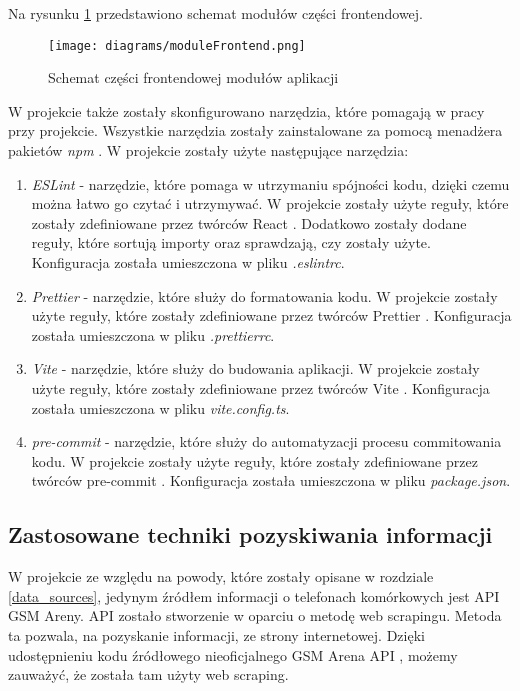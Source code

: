 Na rysunku \ref{module_frontend} przedstawiono schemat modułów części frontendowej.

\begin{figure}[H]
    \centering
    \texttt{[image: diagrams/moduleFrontend.png]}
    \caption{Schemat części frontendowej modułów aplikacji}
    \label{module_frontend}
\end{figure}

W projekcie także zostały skonfigurowano narzędzia, które pomagają w pracy przy projekcie. Wszystkie narzędzia zostały zainstalowane za pomocą menadżera pakietów \textit{npm} \cite{npm}. W projekcie zostały użyte następujące narzędzia:
\begin{enumerate}
    \item \textit{ESLint} \cite{ESLint} - narzędzie, które pomaga w utrzymaniu spójności kodu, dzięki czemu można łatwo go czytać i utrzymywać. W projekcie zostały użyte reguły, które zostały zdefiniowane przez twórców React \cite{React}. Dodatkowo zostały dodane reguły, które sortują importy oraz sprawdzają, czy zostały użyte. Konfiguracja została umieszczona w pliku \textit{.eslintrc}.
    \item \textit{Prettier} \cite{Prettier} - narzędzie, które służy do formatowania kodu. W projekcie zostały użyte reguły, które zostały zdefiniowane przez twórców Prettier \cite{Prettier}. Konfiguracja została umieszczona w pliku \textit{.prettierrc}.
    \item \textit{Vite} \cite{vite} - narzędzie, które służy do budowania aplikacji. W projekcie zostały użyte reguły, które zostały zdefiniowane przez twórców Vite \cite{vite}. Konfiguracja została umieszczona w pliku \textit{vite.config.ts}.
    \item \textit{pre-commit} \cite{pre_commit} - narzędzie, które służy do automatyzacji procesu commitowania kodu. W projekcie zostały użyte reguły, które zostały zdefiniowane przez twórców pre-commit \cite{pre_commit}. Konfiguracja została umieszczona w pliku \textit{package.json}.
\end{enumerate}

\subsection{Zastosowane techniki pozyskiwania informacji}
W projekcie ze względu na powody, które zostały opisane w rozdziale \ref{data_sources}, jedynym źródłem informacji o telefonach komórkowych jest API GSM Areny. API zostało stworzenie w oparciu o metodę web scrapingu. Metoda ta pozwala, na pozyskanie informacji, ze strony internetowej. Dzięki udostępnieniu kodu źródłowego nieoficjalnego GSM Arena API \cite{gsm_arena_api}, możemy zauważyć, że została tam użyty web scraping.

